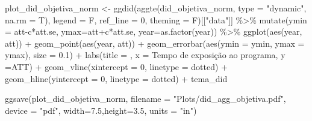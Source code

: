 \documentclass[
  letterpaper,
  DIV=11,
  numbers=noendperiod]{scrartcl}
\newenvironment{Shaded}{\begin{snugshade}}{\end{snugshade}}
\newcommand{\AttributeTok}[1]{\textcolor[rgb]{0.40,0.45,0.13}{#1}}
\newcommand{\DecValTok}[1]{\textcolor[rgb]{0.68,0.00,0.00}{#1}}
\newcommand{\FloatTok}[1]{\textcolor[rgb]{0.68,0.00,0.00}{#1}}
\newcommand{\FunctionTok}[1]{\textcolor[rgb]{0.28,0.35,0.67}{#1}}
\newcommand{\NormalTok}[1]{\textcolor[rgb]{0.00,0.23,0.31}{#1}}
\newcommand{\OtherTok}[1]{\textcolor[rgb]{0.00,0.23,0.31}{#1}}
\newcommand{\SpecialCharTok}[1]{\textcolor[rgb]{0.37,0.37,0.37}{#1}}
\newcommand{\StringTok}[1]{\textcolor[rgb]{0.13,0.47,0.30}{#1}}
\begin{document}
\begin{Shaded}
\begin{Highlighting}[]
\NormalTok{plot\_did\_objetiva\_norm }\OtherTok{\textless{}{-}}
\FunctionTok{ggdid}\NormalTok{(}\FunctionTok{aggte}\NormalTok{(did\_objetiva\_norm, }\AttributeTok{type =} \StringTok{"dynamic"}\NormalTok{, }\AttributeTok{na.rm =}\NormalTok{ T),       }
      \AttributeTok{legend =}\NormalTok{ F, }\AttributeTok{ref\_line =} \DecValTok{0}\NormalTok{, }\AttributeTok{theming =}\NormalTok{ F)[[}\StringTok{"data"}\NormalTok{]] }\SpecialCharTok{\%\textgreater{}\%} 
    \FunctionTok{mutate}\NormalTok{(}\AttributeTok{ymin =}\NormalTok{ att}\SpecialCharTok{{-}}\NormalTok{c}\SpecialCharTok{*}\NormalTok{att.se, }\AttributeTok{ymax=}\NormalTok{att}\SpecialCharTok{+}\NormalTok{c}\SpecialCharTok{*}\NormalTok{att.se, }\AttributeTok{year=}\FunctionTok{as.factor}\NormalTok{(year)) }\SpecialCharTok{\%\textgreater{}\%} 
    \FunctionTok{ggplot}\NormalTok{(}\FunctionTok{aes}\NormalTok{(year, att)) }\SpecialCharTok{+}
    \FunctionTok{geom\_point}\NormalTok{(}\FunctionTok{aes}\NormalTok{(year, att)) }\SpecialCharTok{+}
    \FunctionTok{geom\_errorbar}\NormalTok{(}\FunctionTok{aes}\NormalTok{(}\AttributeTok{ymin =}\NormalTok{ ymin, }\AttributeTok{ymax =}\NormalTok{ ymax), }\AttributeTok{size =} \FloatTok{0.1}\NormalTok{) }\SpecialCharTok{+}
    \FunctionTok{labs}\NormalTok{(}\AttributeTok{title =} \StringTok{\textquotesingle{}\textquotesingle{}}\NormalTok{,}
         \AttributeTok{x =} \StringTok{\textquotesingle{}Tempo de exposição ao programa\textquotesingle{}}\NormalTok{,}
         \AttributeTok{y =}\StringTok{\textquotesingle{}ATT\textquotesingle{}}\NormalTok{) }\SpecialCharTok{+}
    \FunctionTok{geom\_vline}\NormalTok{(}\AttributeTok{xintercept =} \StringTok{\textquotesingle{}0\textquotesingle{}}\NormalTok{, }\AttributeTok{linetype =} \StringTok{\textquotesingle{}dotted\textquotesingle{}}\NormalTok{) }\SpecialCharTok{+}
    \FunctionTok{geom\_hline}\NormalTok{(}\AttributeTok{yintercept =} \DecValTok{0}\NormalTok{, }\AttributeTok{linetype =} \StringTok{\textquotesingle{}dotted\textquotesingle{}}\NormalTok{) }\SpecialCharTok{+}
\NormalTok{    tema\_did}

\FunctionTok{ggsave}\NormalTok{(plot\_did\_objetiva\_norm, }
       \AttributeTok{filename =} \StringTok{"Plots/did\_agg\_objetiva.pdf"}\NormalTok{,}
       \AttributeTok{device =} \StringTok{"pdf"}\NormalTok{,}
       \AttributeTok{width=}\FloatTok{7.5}\NormalTok{,}\AttributeTok{height=}\FloatTok{3.5}\NormalTok{, }\AttributeTok{units =} \StringTok{"in"}\NormalTok{)}
\end{Highlighting}
\end{Shaded}
\end{document}
